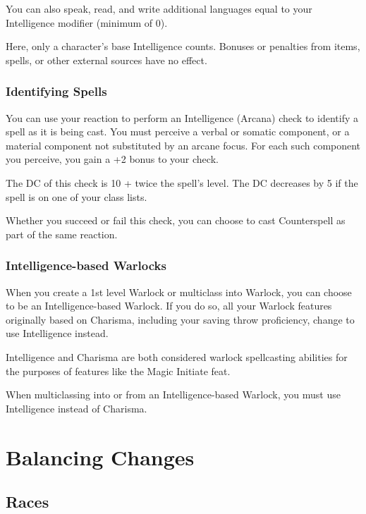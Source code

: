 \documentclass[letterpaper,twocolumn,openany,nodeprecatedcode]{dndbook}
\begin{document}
You can also speak, read, and write additional languages equal to your Intelligence modifier (minimum of 0).

Here, only a character's base Intelligence counts. Bonuses or penalties from items, spells, or other external sources have no effect.

\subsection{Identifying Spells}
You can use your reaction to perform an Intelligence (Arcana) check to identify a spell as it is being cast. You must perceive a verbal or somatic component, or a material component not substituted by an arcane focus. For each such component you perceive, you gain a +2 bonus to your check.

The DC of this check is 10 + twice the spell's level. The DC decreases by 5 if the spell is on one of your class lists. 

Whether you succeed or fail this check, you can choose to cast Counterspell as part of the same reaction.

\label{gameplay-warlock-int}
\subsection{Intelligence-based Warlocks}
When you create a 1st level Warlock or multiclass into Warlock, you can choose to be an Intelligence-based Warlock. If you do so, all your Warlock features originally based on Charisma, including your saving throw proficiency, change to use Intelligence instead.

Intelligence and Charisma are both considered warlock spellcasting abilities for the purposes of features like the Magic Initiate feat.

When multiclassing into or from an Intelligence-based Warlock, you must use Intelligence instead of Charisma.










\chapter{Balancing Changes}

\label{balance-races}
\section{Races}
\label{balance-race-flying}
\end{document}
